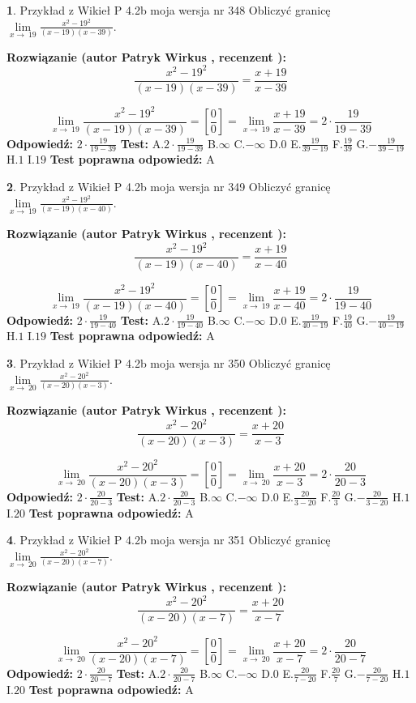 \documentclass[12pt, a4paper]{article}
\theoremstyle{definition} %
\newtheorem{zad}{}
\newcommand{\zadStart}[1]{\begin{zad}#1\newline}
\newcommand{\zadStop}{\end{zad}}
\newcommand{\rozwStart}[2]{\noindent \textbf{Rozwiązanie (autor #1 , recenzent #2): }\newline}
\newcommand{\rozwStop}{\newline}
\newcommand{\odpStart}{\noindent \textbf{Odpowiedź:}\newline}
\newcommand{\odpStop}{\newline}
\newcommand{\testStart}{\noindent \textbf{Test:}\newline}
\newcommand{\testStop}{\newline}
\newcommand{\kluczStart}{\noindent \textbf{Test poprawna odpowiedź:}\newline}
\newcommand{\kluczStop}{\newline}
\begin{document}
\zadStart{Przykład z Wikieł P 4.2b moja wersja nr 348}
Obliczyć granicę $\lim\limits_{x\to\ 19}\frac{x^{2}-19^{2}}{(x-19)(x-39)}$.
\zadStop
\rozwStart{Patryk Wirkus}{}
$$\frac{x^{2}-19^{2}}{(x-19)(x-39)}=\frac{x+19}{x-39}$$

$$\lim\limits_{x\to\ 19}\frac{x^{2}-19^{2}}{(x-19)(x-39)}=[\frac{0}{0}]=\lim\limits_{x\to\ 19}\frac{x+19}{x-39}=2 \cdot \frac{19}{19-39}$$
\rozwStop
\odpStart
$2 \cdot \frac{19}{19-39}$
\odpStop
\testStart
A.$2 \cdot \frac{19}{19-39}$
B.$\infty$
C.$-\infty$
D.$0$
E.$\frac{19}{39-19}$
F.$\frac{19}{39}$
G.$-\frac{19}{39-19}$
H.$1$
I.$19$
\testStop
\kluczStart
A
\kluczStop



\zadStart{Przykład z Wikieł P 4.2b moja wersja nr 349}
Obliczyć granicę $\lim\limits_{x\to\ 19}\frac{x^{2}-19^{2}}{(x-19)(x-40)}$.
\zadStop
\rozwStart{Patryk Wirkus}{}
$$\frac{x^{2}-19^{2}}{(x-19)(x-40)}=\frac{x+19}{x-40}$$

$$\lim\limits_{x\to\ 19}\frac{x^{2}-19^{2}}{(x-19)(x-40)}=[\frac{0}{0}]=\lim\limits_{x\to\ 19}\frac{x+19}{x-40}=2 \cdot \frac{19}{19-40}$$
\rozwStop
\odpStart
$2 \cdot \frac{19}{19-40}$
\odpStop
\testStart
A.$2 \cdot \frac{19}{19-40}$
B.$\infty$
C.$-\infty$
D.$0$
E.$\frac{19}{40-19}$
F.$\frac{19}{40}$
G.$-\frac{19}{40-19}$
H.$1$
I.$19$
\testStop
\kluczStart
A
\kluczStop



\zadStart{Przykład z Wikieł P 4.2b moja wersja nr 350}
Obliczyć granicę $\lim\limits_{x\to\ 20}\frac{x^{2}-20^{2}}{(x-20)(x-3)}$.
\zadStop
\rozwStart{Patryk Wirkus}{}
$$\frac{x^{2}-20^{2}}{(x-20)(x-3)}=\frac{x+20}{x-3}$$

$$\lim\limits_{x\to\ 20}\frac{x^{2}-20^{2}}{(x-20)(x-3)}=[\frac{0}{0}]=\lim\limits_{x\to\ 20}\frac{x+20}{x-3}=2 \cdot \frac{20}{20-3}$$
\rozwStop
\odpStart
$2 \cdot \frac{20}{20-3}$
\odpStop
\testStart
A.$2 \cdot \frac{20}{20-3}$
B.$\infty$
C.$-\infty$
D.$0$
E.$\frac{20}{3-20}$
F.$\frac{20}{3}$
G.$-\frac{20}{3-20}$
H.$1$
I.$20$
\testStop
\kluczStart
A
\kluczStop



\zadStart{Przykład z Wikieł P 4.2b moja wersja nr 351}
Obliczyć granicę $\lim\limits_{x\to\ 20}\frac{x^{2}-20^{2}}{(x-20)(x-7)}$.
\zadStop
\rozwStart{Patryk Wirkus}{}
$$\frac{x^{2}-20^{2}}{(x-20)(x-7)}=\frac{x+20}{x-7}$$

$$\lim\limits_{x\to\ 20}\frac{x^{2}-20^{2}}{(x-20)(x-7)}=[\frac{0}{0}]=\lim\limits_{x\to\ 20}\frac{x+20}{x-7}=2 \cdot \frac{20}{20-7}$$
\rozwStop
\odpStart
$2 \cdot \frac{20}{20-7}$
\odpStop
\testStart
A.$2 \cdot \frac{20}{20-7}$
B.$\infty$
C.$-\infty$
D.$0$
E.$\frac{20}{7-20}$
F.$\frac{20}{7}$
G.$-\frac{20}{7-20}$
H.$1$
I.$20$
\testStop
\kluczStart
A
\kluczStop
\end{document}
